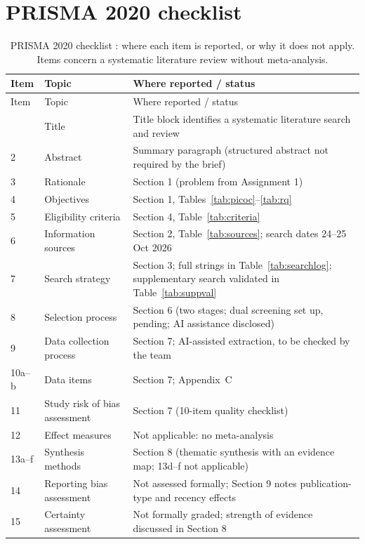 \clearpage
\section{PRISMA 2020 checklist}
{\footnotesize
\begin{longtable}{@{}P{0.9cm}P{5.6cm}P{9.4cm}@{}}
\caption{PRISMA 2020 checklist \cite{page2021}: where each item is reported, or why it does not apply. Items concern a systematic literature review without meta-analysis.}\label{tab:prismacheck}\\
\toprule Item & Topic & Where reported / status \\ \midrule \endfirsthead
\toprule Item & Topic & Where reported / status \\ \midrule \endhead
\bottomrule {} & Title & Title block identifies a systematic literature search and review \\
2 & Abstract & Summary paragraph (structured abstract not required by the brief) \\
3 & Rationale & Section 1 (problem from Assignment 1) \\
4 & Objectives & Section 1, Tables~\ref{tab:picoc}--\ref{tab:rq} \\
5 & Eligibility criteria & Section 4, Table~\ref{tab:criteria} \\
6 & Information sources & Section 2, Table~\ref{tab:sources}; search dates 24--25 Oct 2026 \\
7 & Search strategy & Section 3; full strings in Table~\ref{tab:searchlog}; supplementary search validated in Table~\ref{tab:suppval} \\
8 & Selection process & Section 6 (two stages; dual screening set up, pending; AI assistance disclosed) \\
9 & Data collection process & Section 7; AI-assisted extraction, to be checked by the team \\
10a--b & Data items & Section 7; Appendix~C \\
11 & Study risk of bias assessment & Section 7 (10-item quality checklist) \\
12 & Effect measures & Not applicable: no meta-analysis \\
13a--f & Synthesis methods & Section 8 (thematic synthesis with an evidence map; 13d--f not applicable) \\
14 & Reporting bias assessment & Not assessed formally; Section 9 notes publication-type and recency effects \\
15 & Certainty assessment & Not formally graded; strength of evidence discussed in Section 8 \\

\end{longtable}}
